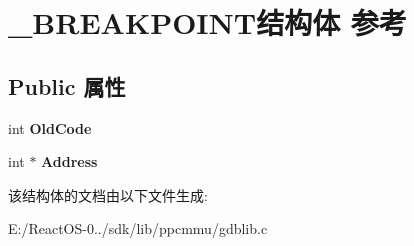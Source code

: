 \hypertarget{struct___b_r_e_a_k_p_o_i_n_t}{}\section{\+\_\+\+B\+R\+E\+A\+K\+P\+O\+I\+N\+T结构体 参考}
\label{struct___b_r_e_a_k_p_o_i_n_t}
\subsection*{Public 属性}
\begin{DoxyCompactItemize}
\item 
\mbox{\label{struct___b_r_e_a_k_p_o_i_n_t_a96c2d0cc0b548f3e445a10663ed5fd4b}} 
int {\bfseries Old\+Code}
\item 
\mbox{\label{struct___b_r_e_a_k_p_o_i_n_t_a653220fa40030d9d282aa2c64506bc75}} 
int $\ast$ {\bfseries Address}
\end{DoxyCompactItemize}


该结构体的文档由以下文件生成\+:\begin{DoxyCompactItemize}
\item 
E\+:/\+React\+O\+S-\/0../sdk/lib/ppcmmu/gdblib.\+c\end{DoxyCompactItemize}
